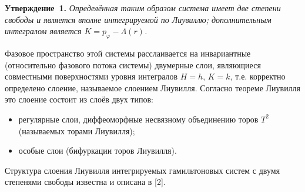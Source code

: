 \textbf{Утверждение~1.} {\it Определённая таким образом система имеет две степени свободы и является вполне интегрируемой по Лиувиллю; дополнительным интегралом является $K=p_\varphi-\Lambda(r)$.}

Фазовое пространство этой системы расслаивается на инвариантные (относительно фазового потока системы) двумерные слои, являющиеся совместными поверхностями уровня интегралов $H=h$, $K=k$, т.е. корректно определено слоение, называемое слоением Лиувилля. Согласно теореме Лиувилля это слоение состоит из слоёв двух типов:
\begin{itemize}
	\item регулярные слои, диффеоморфные несвязному объединению торов $T^2$ (называемых торами Лиувилля);
	\item особые слои (бифуркации торов Лиувилля).
\end{itemize}

Структура слоения Лиувилля интегрируемых гамильтоновых систем с двумя степенями свободы известна и описана в [2].

